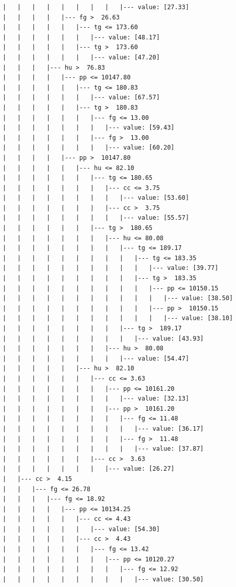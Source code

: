 \documentclass[UTF8, a4paper]{ctexart}
\begin{document}
\begin{lstlisting}
|   |   |   |   |   |   |   |   |--- value: [27.33]
|   |   |   |   |--- fg >  26.63
|   |   |   |   |   |--- tg <= 173.60
|   |   |   |   |   |   |--- value: [48.17]
|   |   |   |   |   |--- tg >  173.60
|   |   |   |   |   |   |--- value: [47.20]
|   |   |   |--- hu >  76.83
|   |   |   |   |--- pp <= 10147.80
|   |   |   |   |   |--- tg <= 180.83
|   |   |   |   |   |   |--- value: [67.57]
|   |   |   |   |   |--- tg >  180.83
|   |   |   |   |   |   |--- fg <= 13.00
|   |   |   |   |   |   |   |--- value: [59.43]
|   |   |   |   |   |   |--- fg >  13.00
|   |   |   |   |   |   |   |--- value: [60.20]
|   |   |   |   |--- pp >  10147.80
|   |   |   |   |   |--- hu <= 82.10
|   |   |   |   |   |   |--- tg <= 180.65
|   |   |   |   |   |   |   |--- cc <= 3.75
|   |   |   |   |   |   |   |   |--- value: [53.60]
|   |   |   |   |   |   |   |--- cc >  3.75
|   |   |   |   |   |   |   |   |--- value: [55.57]
|   |   |   |   |   |   |--- tg >  180.65
|   |   |   |   |   |   |   |--- hu <= 80.08
|   |   |   |   |   |   |   |   |--- tg <= 189.17
|   |   |   |   |   |   |   |   |   |--- tg <= 183.35
|   |   |   |   |   |   |   |   |   |   |--- value: [39.77]
|   |   |   |   |   |   |   |   |   |--- tg >  183.35
|   |   |   |   |   |   |   |   |   |   |--- pp <= 10150.15
|   |   |   |   |   |   |   |   |   |   |   |--- value: [38.50]
|   |   |   |   |   |   |   |   |   |   |--- pp >  10150.15
|   |   |   |   |   |   |   |   |   |   |   |--- value: [38.10]
|   |   |   |   |   |   |   |   |--- tg >  189.17
|   |   |   |   |   |   |   |   |   |--- value: [43.93]
|   |   |   |   |   |   |   |--- hu >  80.08
|   |   |   |   |   |   |   |   |--- value: [54.47]
|   |   |   |   |   |--- hu >  82.10
|   |   |   |   |   |   |--- cc <= 3.63
|   |   |   |   |   |   |   |--- pp <= 10161.20
|   |   |   |   |   |   |   |   |--- value: [32.13]
|   |   |   |   |   |   |   |--- pp >  10161.20
|   |   |   |   |   |   |   |   |--- fg <= 11.48
|   |   |   |   |   |   |   |   |   |--- value: [36.17]
|   |   |   |   |   |   |   |   |--- fg >  11.48
|   |   |   |   |   |   |   |   |   |--- value: [37.87]
|   |   |   |   |   |   |--- cc >  3.63
|   |   |   |   |   |   |   |--- value: [26.27]
|   |--- cc >  4.15
|   |   |--- fg <= 26.78
|   |   |   |--- fg <= 18.92
|   |   |   |   |--- pp <= 10134.25
|   |   |   |   |   |--- cc <= 4.43
|   |   |   |   |   |   |--- value: [54.30]
|   |   |   |   |   |--- cc >  4.43
|   |   |   |   |   |   |--- fg <= 13.42
|   |   |   |   |   |   |   |--- pp <= 10120.27
|   |   |   |   |   |   |   |   |--- fg <= 12.92
|   |   |   |   |   |   |   |   |   |--- value: [30.50]

\end{lstlisting}
\end{document}
